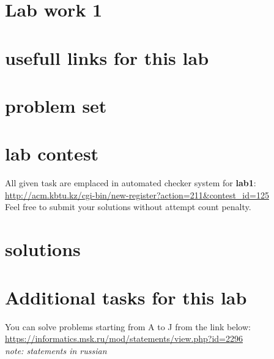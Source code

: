\documentclass[12pt]{article}%
\begin{document}
    \section{Lab work 1}
    \section{usefull links for this lab}
    \section{problem set}
    
    
    
    
    

    \section{lab contest}
    
    All given task are emplaced in automated checker system for \textbf{lab1}: \url{http://acm.kbtu.kz/cgi-bin/new-register?action=211&contest_id=125}\\
    Feel free to submit your solutions without attempt count penalty.

    \section{solutions}
    
    
    
    
    

    \section{Additional tasks for this lab}
    You can solve problems starting from A to J from the link below:\\
    \url{https://informatics.msk.ru/mod/statements/view.php?id=2296}\\
    \textit{note: statements in russian}
\end{document}
